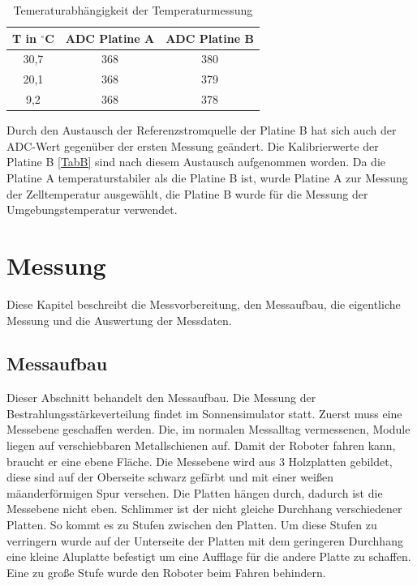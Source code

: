 \documentclass[a4paper,bibtotoc,oneside]{scrbook}
\begin{document}
\begin{table}[htbp]
\centering
\begin{tabular}{ | c | c | c |}\hline
{\bf T in $^{\circ}$C} & {\bf ADC Platine A} & {\bf ADC Platine B}\\ \hline
\hline
30,7 & 368 & 380\\ \hline
20,1 & 368 & 379\\ \hline
9,2 & 368 & 378\\ \hline
\end{tabular}
\caption{Temeraturabhängigkeit der Temperaturmessung}\label{TabT2}
\end{table}

Durch den Austausch der Referenzstromquelle der Platine B hat sich auch der ADC-Wert gegenüber der ersten Messung geändert. Die Kalibrierwerte der Platine B \ref{TabB} sind nach diesem Austausch aufgenommen worden.
Da die Platine A temperaturstabiler als die Platine B ist, wurde Platine A zur Messung der Zelltemperatur ausgewählt, die Platine B wurde für die Messung der Umgebungstemperatur verwendet. 

\chapter{Messung}\thispagestyle{empty}

Diese Kapitel beschreibt die Messvorbereitung, den Messaufbau, die eigentliche Messung und die Auswertung der Messdaten.

\section{Messaufbau}\thispagestyle{empty}
Dieser Abschnitt behandelt den Messaufbau. Die Messung der Bestrahlungsstärkeverteilung findet im Sonnensimulator statt. Zuerst muss eine Messebene geschaffen werden. Die, im normalen Messalltag vermessenen, Module liegen auf verschiebbaren Metallschienen auf. Damit der Roboter fahren kann, braucht er eine ebene Fläche. Die Messebene wird aus 3 Holzplatten gebildet, diese sind auf der Oberseite schwarz gefärbt und mit einer weißen mäanderförmigen Spur versehen. Die Platten hängen durch, dadurch ist die Messebene nicht eben. Schlimmer ist der nicht gleiche Durchhang verschiedener Platten. So kommt es zu Stufen zwischen den Platten. Um diese Stufen zu verringern wurde auf der Unterseite der Platten mit dem geringeren Durchhang eine kleine Aluplatte befestigt um eine Aufflage für die andere Platte zu schaffen. Eine zu große Stufe wurde den Roboter beim Fahren behindern.
\end{document}
